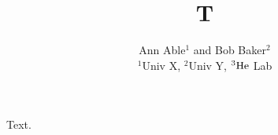 \documentclass{article}
\begin{document}
\title{T}
\author{Ann Able$^{1}$ and Bob Baker$^{2}$\\ $^{1}$Univ X, $^{2}$Univ Y, ${\rm ^{3}He}$ Lab}
\maketitle
Text.
\end{document}

